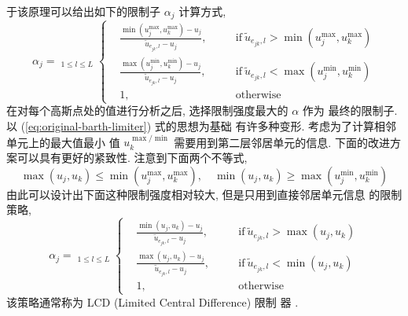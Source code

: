 于该原理可以给出如下的限制子 $\alpha_{j}$ 计算方式,
\begin{equation}
  \label{eq:original-barth-limiter}
  \alpha_{j} = \mathop{\min_{\forall e_{jk} \in \partial
      T_{j}}}_{1\le l\le L}
  \left\{
    \begin{aligned}
      &\frac{\min(u_{j}^{\max}, u_{k}^{\max}) -
        u_{j}}{\tilde{u}_{e_{jk},l} - u_{j}}, &\quad &\mbox{if}~
      \tilde{u}_{e_{jk},l} > \min(u_{j}^{\max}, u_{k}^{\max})\\
      &\frac{\max(u_{j}^{\min}, u_{k}^{\min}) -
        u_{j}}{\tilde{u}_{e_{jk},l}- u_{j}}, &\quad
      &\mbox{if}~\tilde{u}_{e_{jk},l} < \max
      (u_{j}^{\min},u_{k}^{\min})\\
      &1,  &\quad &\mbox{otherwise}
    \end{aligned}
  \right.
\end{equation}
在对每个高斯点处的值进行分析之后, 选择限制强度最大的 $\alpha$ 作为
最终的限制子. 以 (\ref{eq:original-barth-limiter}) 式的思想为基础
有许多种变形. 考虑为了计算相邻单元上的最大值最小
值 $u_{k}^{\max/\min}$ 需要用到第二层邻居单元的信息. 下面的改进方
案可以具有更好的紧致性.  注意到下面两个不等式,
\begin{equation}
  \label{eq:simplify-inequality}
  \max \left( u_{j}, u_{k} \right) \le \min \left(
    u_{j}^{\max},u_{k}^{\max} \right), \quad
  \min \left( u_{j}, u_{k} \right) \ge \max \left(
    u_{j}^{\min}, u_{k}^{\min}
  \right)
\end{equation}
由此可以设计出下面这种限制强度相对较大, 但是只用到直接邻居单元信息
的限制策略,
\begin{equation}
  \label{eq:LCD-limiter}
  \alpha_{j} = \mathop{\min_{\forall e_{jk} \in \partial
      T_{j}}}_{1\le l\le L}
  \left\{
    \begin{aligned}
      &\frac{\min(u_{j}, u_{k}) -
        u_{j}}{\tilde{u}_{e_{jk},l} - u_{j}}, &\quad &\mbox{if}~
      \tilde{u}_{e_{jk},l} > \max(u_{j}, u_{k})\\
      &\frac{\max(u_{j}, u_{k}) -
        u_{j}}{\tilde{u}_{e_{jk},l}- u_{j}}, &\quad
      &\mbox{if}~\tilde{u}_{e_{jk},l} < \min
      (u_{j},u_{k})\\
      &1,  &\quad &\mbox{otherwise}
    \end{aligned}
  \right.
\end{equation}
该策略通常称为 LCD (Limited Central Difference) 限制
器 \cite{Batten1996,Hubbard1999}.

